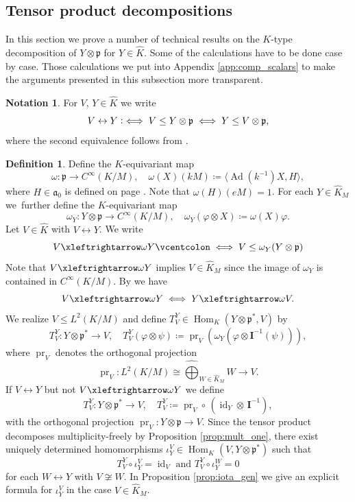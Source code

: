 \documentclass[JEP,XML,SOM,NoFloatCountersInSection,Unicode,published]{cedram}
\theoremstyle{definition}
\newtheorem{definition}[theorem]{Definition}
\newtheorem{notation}[theorem]{Notation}
\newcommand{\lra}{\ensuremath{\leftrightarrow}}
\newcommand{\lraomega}{\ensuremath{\xleftrightarrow\omega}}
\newcommand{\Ad}{\ensuremath{\on{Ad}}}
\newcommand{\mf}[1]{\ensuremath{\mathfrak{#1}}}
\newcommand{\on}[1]{\ensuremath{\operatorname{#1}}}
\newcommand{\Hom}[3]{\ensuremath{\on{Hom}_{#1}(#2,#3)}}
\newcommand{\I}{\ensuremath{\mathbf{I}}}
\begin{document}
\subsection{Tensor product decompositions}
In this section we prove a number of technical results on the $K$-type decomposition of $Y\otimes\mf p$ for $Y\in\hat K$. Some of the calculations have to be done case by case. Those calculations we put into Appendix \ref{app:comp_scalars} to make the arguments presented in this subsection more transparent.
\begin{notation}
For $V$, $Y\in\hat K$ we write
\[
V\leftrightarrow Y\vcentcolon\iff V\leq Y\otimes\mf p\iff Y\leq V\otimes\mf p,
\]
where the second equivalence follows from \cite[Rem.\,2.8]{BransonOlafsson}.
\end{notation}

\begin{definition}\label{def:omega}
Define the $K$-equivariant map
\[
\omega:\mf p\to C^\infty(K/M),\quad \omega(X)(kM)\coloneqq\langle\Ad(k^{-1})X,H\rangle,
\]
where $H\in\mf a_0$ is defined on page \pageref{eq:distr_elem_ps}. Note that $\omega(H)(eM)=1$. For each $Y\in\hat K_M$ we~further define the $K$-equivariant map
\[
\omega_Y:Y\otimes\mf p\to C^\infty(K/M),\quad\omega_Y(\varphi\otimes X)\coloneqq\omega(X)\varphi.
\]
Let $V\in\hat K$ with $V\lra Y$. We write
\[
V\lraomega Y\vcentcolon\iff V\leq\omega_Y(Y\otimes\mf p)
\]
Note that $V\lraomega Y$ implies $V\in\hat K_M$ since the image of $\omega_Y$ is contained in $C^\infty(K/M)$. By \cite[Lem.\,4.4(c)]{BransonOlafsson} we have
\[
V\lraomega Y\iff Y\lraomega V.
\]
We realize $V\leq L^2(K/M)$ and define $T_V^Y\in\Hom{K}{Y\otimes\mf p^*}{V}$ by
\[
T_V^Y:Y\otimes\mf p^*\to V,\quad T_V^Y(\varphi\otimes\psi)\coloneqq\on{pr}_V(\omega_Y(\varphi\otimes\I^{-1}(\psi))),
\]
where $\on{pr}_V$ denotes the orthogonal projection
\[
\on{pr}_V:L^2(K/M)\cong\widehat\bigoplus_{W\in\hat K_M}W\to V.
\]
If $V\lra Y$ but not $V\lraomega Y$ we define
\[
T_V^Y:Y\otimes\mf p^*\to V,\quad T_V^Y\coloneqq\on{pr}_V\circ\,(\on{id}_Y\otimes\,\I^{-1}),
\]
with the orthogonal projection $\on{pr}_V:Y\otimes\mf p\to V$. Since the tensor product decomposes multiplicity-freely by Proposition \ref{prop:mult_one}, there exist uniquely determined homomorphisms $\iota_Y^V\in\Hom{K}{V}{Y\otimes\mf p^*}$ such that
\[
T_V^Y\circ\iota_Y^V=\on{id}_V\text{ and }T_V^Y\circ\iota_Y^W=0
\]
for each $W\leftrightarrow Y$ with $V\not\cong W$. In Proposition \ref{prop:iota_gen} we give an explicit formula for $\iota_Y^V$ in the case $V\in\hat K_M$.
\end{definition}
\end{document}
